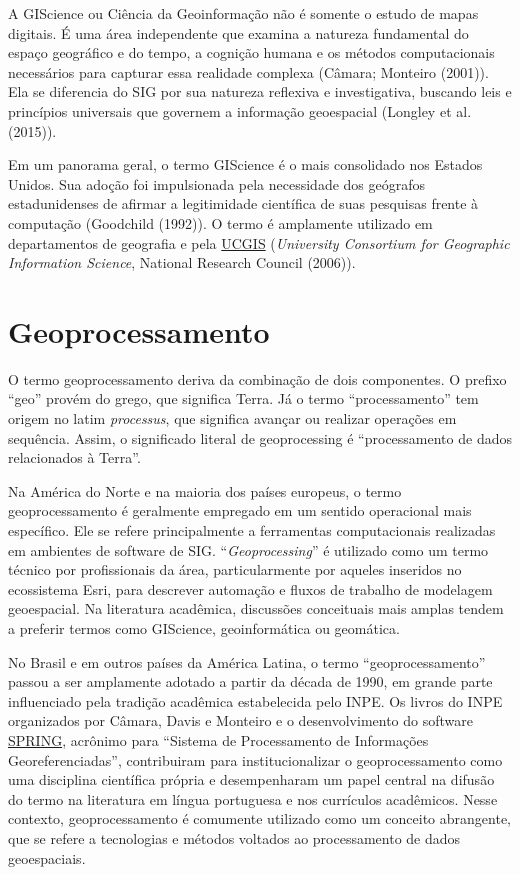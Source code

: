 \documentclass[
  letterpaper,
  DIV=11,
  numbers=noendperiod]{scrreprt}
\begin{document}
A GIScience ou Ciência da Geoinformação não é somente o estudo de mapas
digitais. É uma área independente que examina a natureza fundamental do
espaço geográfico e do tempo, a cognição humana e os métodos
computacionais necessários para capturar essa realidade complexa
(Câmara; Monteiro (2001)). Ela se diferencia do SIG por sua natureza
reflexiva e investigativa, buscando leis e princípios universais que
governem a informação geoespacial (Longley et al. (2015)).

Em um panorama geral, o termo GIScience é o mais consolidado nos Estados
Unidos. Sua adoção foi impulsionada pela necessidade dos geógrafos
estadunidenses de afirmar a legitimidade científica de suas pesquisas
frente à computação (Goodchild (1992)). O termo é amplamente utilizado
em departamentos de geografia e pela
\href{https://www.ucgis.org/}{UCGIS} (\emph{University Consortium for
Geographic Information Science}, National Research Council (2006)).

\section{Geoprocessamento}\label{geoprocessamento}

O termo geoprocessamento deriva da combinação de dois componentes. O
prefixo ``geo'' provém do grego, que significa Terra. Já o termo
``processamento'' tem origem no latim \emph{processus}, que significa
avançar ou realizar operações em sequência. Assim, o significado literal
de geoprocessing é ``processamento de dados relacionados à Terra''.

Na América do Norte e na maioria dos países europeus, o termo
geoprocessamento é geralmente empregado em um sentido operacional mais
específico. Ele se refere principalmente a ferramentas computacionais
realizadas em ambientes de software de SIG. ``\emph{Geoprocessing}'' é
utilizado como um termo técnico por profissionais da área,
particularmente por aqueles inseridos no ecossistema Esri, para
descrever automação e fluxos de trabalho de modelagem geoespacial. Na
literatura acadêmica, discussões conceituais mais amplas tendem a
preferir termos como GIScience, geoinformática ou geomática.

No Brasil e em outros países da América Latina, o termo
``geoprocessamento'' passou a ser amplamente adotado a partir da década
de 1990, em grande parte influenciado pela tradição acadêmica
estabelecida pelo INPE. Os livros do INPE organizados por Câmara, Davis
e Monteiro e o desenvolvimento do software
\href{http://www.dpi.inpe.br/spring/}{SPRING}, acrônimo para ``Sistema
de Processamento de Informações Georeferenciadas'', contribuiram para
institucionalizar o geoprocessamento como uma disciplina científica
própria e desempenharam um papel central na difusão do termo na
literatura em língua portuguesa e nos currículos acadêmicos. Nesse
contexto, geoprocessamento é comumente utilizado como um conceito
abrangente, que se refere a tecnologias e métodos voltados ao
processamento de dados geoespaciais.
\end{document}
